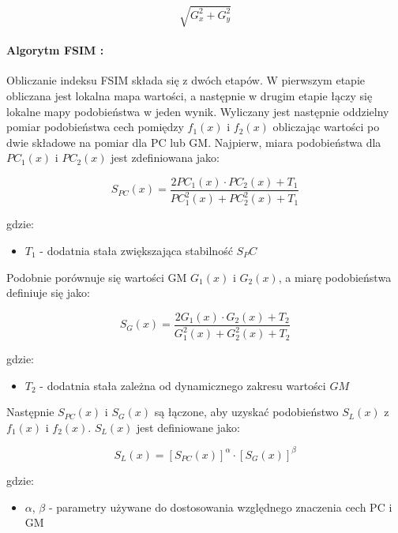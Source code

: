 \documentclass{article}
\begin{document}
\begin{equation}
  \sqrt{G^2_x+G^2_y}
\end{equation}

\paragraph{Algorytm FSIM \cite{fsim_alg}:}
Obliczanie indeksu FSIM składa się z dwóch etapów. 
W pierwszym etapie obliczana jest lokalna mapa wartości, a następnie w drugim etapie łączy się lokalne mapy podobieństwa w jeden wynik.
Wyliczany jest następnie oddzielny pomiar podobieństwa cech pomiędzy $f_1(x)$ i $f_2(x)$ obliczając wartości po dwie 
składowe na pomiar dla PC lub GM. Najpierw, miara podobieństwa dla $PC_1 (x)$ i $PC_2(x)$ jest zdefiniowana jako:

\begin{equation}
  S_{PC}(x) = \frac{2PC_1(x) \cdot PC_2(x) + T_1}{PC^2_1(x) + PC^2_2(x) + T_1}
\end{equation}

gdzie:
\begin{itemize}[label=]
  \item $T_1$ - dodatnia stała zwiększająca stabilność $S_PC$
\end{itemize}

Podobnie porównuje się wartości GM $G_1(x)$ i $G_2(x)$, a miarę podobieństwa definiuje się jako:

\begin{equation}
  S_G(x) = \frac{2G_1(x) \cdot G_2(x) + T_2}{G^2_1(x) + G^2_2(x) + T_2}
\end{equation}

gdzie:
\begin{itemize}[label=]
  \item $T_2$ - dodatnia stała zależna od dynamicznego zakresu wartości $GM$
\end{itemize}

Następnie $S_{PC}(x)$ i $S_G(x)$ są łączone, aby uzyskać podobieństwo $S_L(x)$ z $f_1(x)$ i $f_2(x)$. $S_L(x)$ jest definiowane jako:

\begin{equation}
  S_L(x) = [S_{PC}(x)]^\alpha \cdot [S_G(x)]^\beta
\end{equation}

gdzie:
\begin{itemize}[label=]
  \item $\alpha$, $\beta$ - parametry używane do dostosowania względnego znaczenia cech PC i GM
\end{itemize}
\end{document}
